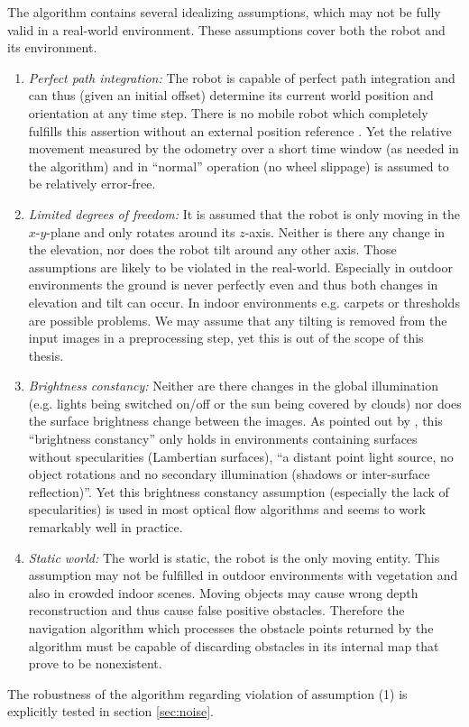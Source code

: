 The algorithm contains several idealizing assumptions, which may not be fully valid in a real-world environment. These assumptions cover both the robot and its environment.
\begin{enumerate}[(1)]
 \item \textit{Perfect path integration:} The robot is capable of perfect path integration and can thus (given an initial offset) determine its current world position and orientation at any time step. There is no mobile robot which completely fulfills this assertion without an external position reference \citep[chapter 3, ``Mobile Robot Kinematics'', p. 57ff]{AutonomousMobileRobots}. Yet the relative movement measured by the odometry over a short time window (as needed in the algorithm) and in ``normal'' operation (no wheel slippage) is assumed to be relatively error-free.
 \item \textit{Limited degrees of freedom:} It is assumed that the robot is only moving in the $x$-$y$-plane and only rotates around its $z$-axis. Neither is there any change in the elevation, nor does the robot tilt around any other axis. Those assumptions are likely to be violated in the real-world. Especially in outdoor environments the ground is never perfectly even and thus both changes in elevation and tilt can occur. In indoor environments e.g. carpets or thresholds are possible problems. We may assume that any tilting is removed from the input images in a preprocessing step, yet this is out of the scope of this thesis.
 \item \textit{Brightness constancy:} Neither are there changes in the global illumination (e.g. lights being switched on/off or the sun being covered by clouds) nor does the surface brightness change between the images. As pointed out by \cite{flowchapter05}, this ``brightness constancy'' only holds in environments containing surfaces without specularities (Lambertian surfaces), ``a distant point light source, no object rotations and no secondary illumination (shadows or inter-surface reflection)''. Yet this brightness constancy assumption (especially the lack of specularities) is used in most optical flow algorithms and seems to work remarkably well in practice.
 \item \textit{Static world:} The world is static, the robot is the only moving entity. This assumption may not be fulfilled in outdoor environments with vegetation and also in crowded indoor scenes. Moving objects may cause wrong depth reconstruction and thus cause false positive obstacles. Therefore the navigation algorithm which processes the obstacle points returned by the algorithm must be capable of discarding obstacles in its internal map that prove to be nonexistent.
\end{enumerate}
The robustness of the algorithm regarding violation of assumption (1) is explicitly tested in section \ref{sec:noise}.

